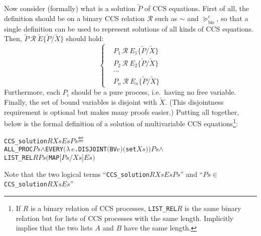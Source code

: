 \documentclass[GCNS]{yincog}
\renewcommand{\HOLinline}[1]{\mbox{\textup{\texttt{#1}}}}
\renewcommand{\HOLConst}[1]{\texttt{#1}}
\renewcommand{\HOLBoundVar}[1]{\ensuremath{\mathit{#1}}}
\renewcommand{\HOLFreeVar}[1]{\ensuremath{\mathit{#1}}}
\renewcommand{\HOLSymConst}[1]{#1}
\renewcommand{\HOLTokenConj}{\ensuremath{\wedge}}
\renewcommand{\HOLTokenIn}{\ensuremath{\in}}
\renewcommand{\HOLTokenDefEquality}{\ensuremath{\mathrel{\overset{\makebox [0pt]{\text{\tiny \textsf{def}}}}{=}}}}
\renewcommand{\HOLTokenLambda}{\ensuremath{\lambda \,}}
\theoremstyle{remark}
\theoremstyle{theorem}
\theoremstyle{remark}
\newcommand{\multivariate}{multivariable\xspace}
\def\Rvtex{\mathcal{R}}
\renewcommand{\tilde}{\widetilde}
\newcommand{\rcontr}{\mathrel{\succeq^{\mathrm{c}}_{\mathrm{bis}}}}
\newcommand{\til}{\tilde}
\begin{document}
Now consider (formally) what is a solution $\til P$ of CCS equations. First
of all, the definition should be
 on a binary CCS relation
$\Rvtex $ such as $\sim $ and $\rcontr $, so that a single definition can
be used to represent solutions of all kinds of CCS equations. Then,
${\til P} \ \Rvtex \  {\til E}\{\til P/\til X\}$ should hold:
%
\begin{equation*}
%
\begin{cases}
&P_1 \ \Rvtex \ E_1\{\til P/\til X\}
\\
&P_2 \ \Rvtex \ E_2\{\til P/\til X\}
\\
& \cdots
\\
&P_n \ \Rvtex \ E_n\{\til P/\til X\}
\end{cases}
%
\end{equation*}
%
Furthermore, each $P_i$ should be a pure process, i.e.~having no free variable.
Finally, the set of bound variables is disjoint with $\til X$. (This disjointness
requirement is optional but makes many proofs easier.) Putting all together,
below is the formal definition of a solution of \multivariate CCS equations\footnote{If
$R$ is a binary relation of CCS processes,
\HOLinline{\HOLConst{LIST\_REL}\\\;\HOLFreeVar{R}} is the same binary relation
but for lists of CCS processes with the same length. Implicitly implies
that the two lists $A$ and $B$ have the same length.}:
%
\begin{alltt}
   \HOLConst{CCS\_solution} \HOLFreeVar{R} \HOLFreeVar{Xs} \HOLFreeVar{Es} \HOLFreeVar{Ps} \HOLTokenDefEquality{}
     \HOLConst{ALL\_PROC} \HOLFreeVar{Ps} \HOLSymConst{\HOLTokenConj{}} \HOLConst{EVERY} \ensuremath{(}\HOLTokenLambda{}\HOLBoundVar{e}. \HOLConst{DISJOINT} \ensuremath{(}\HOLConst{BV} \HOLBoundVar{e}\ensuremath{)} \ensuremath{(}\HOLConst{set} \HOLFreeVar{Xs}\ensuremath{)}\ensuremath{)} \HOLFreeVar{Ps} \HOLSymConst{\HOLTokenConj{}}
     \HOLConst{LIST\_REL} \HOLFreeVar{R} \HOLFreeVar{Ps} \ensuremath{(}\HOLConst{MAP} \ensuremath{[}\HOLFreeVar{Ps}\ensuremath{/}\HOLFreeVar{Xs}\ensuremath{]} \HOLFreeVar{Es}\ensuremath{)}
\end{alltt}
%
Note that the two logical terms ``\HOLinline{\HOLConst{CCS\_solution}\\\;\HOLFreeVar{R}\\\;\HOLFreeVar{Xs}\\\;\HOLFreeVar{Es}\\\;\HOLFreeVar{Ps}}''
and ``\HOLinline{\HOLFreeVar{Ps}\\\;\HOLSymConst{\HOLTokenIn{}}\\\;\HOLConst{CCS\_solution}\\\;\HOLFreeVar{R}\\\;\HOLFreeVar{Xs}\\\;\HOLFreeVar{Es}}''
\end{document}
